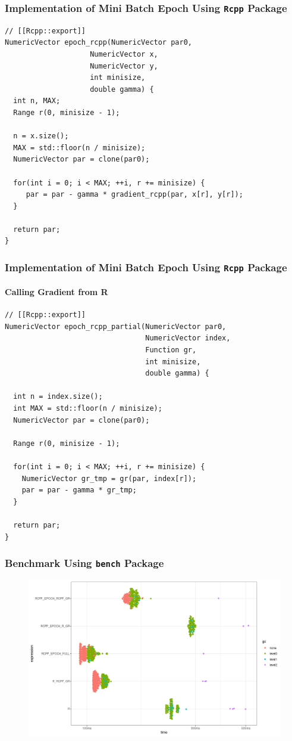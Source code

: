 \documentclass[aspectratio=169]{beamer}
\begin{document}
\begin{frame}[fragile]
    \frametitle{Implementation of Mini Batch Epoch Using \texttt{Rcpp} Package}
\begin{verbatim}
// [[Rcpp::export]]
NumericVector epoch_rcpp(NumericVector par0, 
                    NumericVector x, 
                    NumericVector y,
                    int minisize,
                    double gamma) {
  int n, MAX;
  Range r(0, minisize - 1);
  
  n = x.size();
  MAX = std::floor(n / minisize);
  NumericVector par = clone(par0);
  
  for(int i = 0; i < MAX; ++i, r += minisize) {
     par = par - gamma * gradient_rcpp(par, x[r], y[r]);
  }

  return par;
}
\end{verbatim}
\end{frame}
\begin{frame}[fragile]
    \frametitle{Implementation of Mini Batch Epoch Using \texttt{Rcpp} Package}
    \framesubtitle{Calling Gradient from R}
\begin{verbatim}
// [[Rcpp::export]]
NumericVector epoch_rcpp_partial(NumericVector par0,
                                 NumericVector index,
                                 Function gr,
                                 int minisize,
                                 double gamma) {
  
  int n = index.size();
  int MAX = std::floor(n / minisize);
  NumericVector par = clone(par0);
  
  Range r(0, minisize - 1);
  
  for(int i = 0; i < MAX; ++i, r += minisize) {
    NumericVector gr_tmp = gr(par, index[r]);
    par = par - gamma * gr_tmp;
  }
  
  return par;
}
\end{verbatim}
\end{frame}
\begin{frame}
    \frametitle{Benchmark Using \texttt{bench} Package}
    \begin{figure}
        \centering
        \includegraphics[scale = 0.4]{figure/RcppVR.png}
    \end{figure}
\end{frame}
\end{document}
